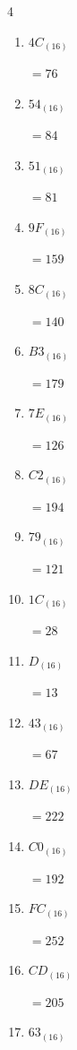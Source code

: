 \begin{multicols}{4}
\begin{enumerate}
  \item $4C_{(16)}$

        $=76$

  \item $54_{(16)}$

        $=84$

  \item $51_{(16)}$

        $=81$

  \item $9F_{(16)}$

        $=159$

  \item $8C_{(16)}$

        $=140$

  \item $B3_{(16)}$

        $=179$

  \item $7E_{(16)}$

        $=126$

  \item $C2_{(16)}$

        $=194$

  \item $79_{(16)}$

        $=121$

  \item $1C_{(16)}$

        $=28$

  \item $D_{(16)}$

        $=13$

  \item $43_{(16)}$

        $=67$

  \item $DE_{(16)}$

        $=222$

  \item $C0_{(16)}$

        $=192$

\columnbreak %

  \item $FC_{(16)}$

        $=252$

  \item $CD_{(16)}$

        $=205$

  \item $63_{(16)}$


\end{enumerate}
\end{multicols}
